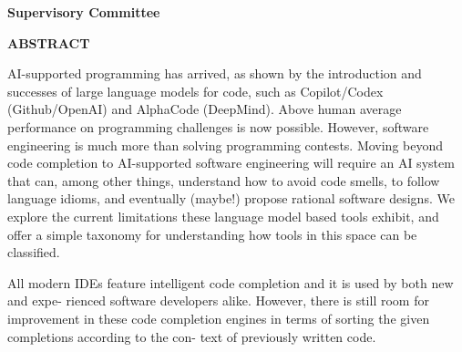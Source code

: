 \newpage
{}

\noindent \textbf{Supervisory Committee}
\tpbreak
\panel

\begin{center}
\textbf{ABSTRACT}
\end{center}

AI-supported programming has arrived, as shown by the introduction and successes of large language models for code, such as Copilot/Codex (Github/OpenAI) and AlphaCode (DeepMind). Above human average performance on programming challenges is now possible. However, software engineering is much more than solving programming contests. Moving beyond code completion to AI-supported software engineering will require an AI system that can, among other things, understand how to avoid code smells, to follow language idioms, and eventually (maybe!) propose rational software designs. We explore the current limitations these language model based tools exhibit, and offer a simple taxonomy for understanding how tools in this space can be classified.

All modern IDEs feature intelligent code completion and it is used by both new and expe- rienced software developers alike. However, there is still room for improvement in these code completion engines in terms of sorting the given completions according to the con- text of previously written code.